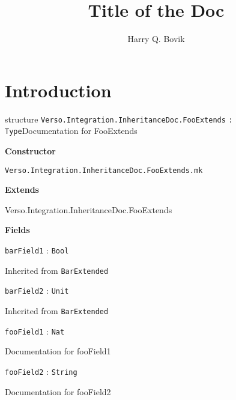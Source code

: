 \documentclass{memoir}
\title{\sffamily Title of the Doc}
\author{\sffamily Harry Q. Bovik}
\date{\sffamily }
\begin{document}
\frontmatter

\begin{titlingpage}
\maketitle
\end{titlingpage}

\tableofcontents

\mainmatter

\chapter*{Introduction}
\begin{docstringBox}{structure}
\texttt{Verso.Integration.InheritanceDoc.FooExtends} \texttt{:}
  \texttt{Type}\tcblower Documentation for FooExtends\par\noindent\textbf{Constructor}\par \par \texttt{Verso.Integration.InheritanceDoc.FooExtends.mk}\par\noindent\textbf{Extends}\par Verso.Integration.InheritanceDoc.FooExtends\par\noindent\textbf{Fields}\par \par \texttt{barField1} : \texttt{Bool}\par Inherited from \texttt{BarExtended}\par \texttt{barField2} : \texttt{Unit}\par Inherited from \texttt{BarExtended}\par \texttt{fooField1} : \texttt{Nat}\par Documentation for fooField1\par \texttt{fooField2} : \texttt{String}\par Documentation for fooField2
\end{docstringBox}
\end{document}
